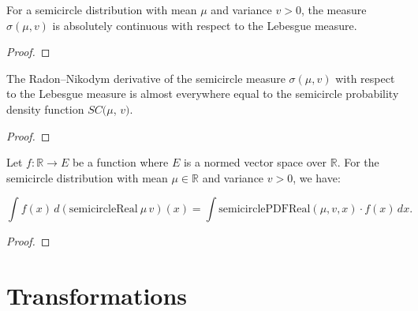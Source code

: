 \begin{lemma}
  \label{lem:semicircleReal_absolutelyContinuous}
  \leanok
  For a semicircle distribution with mean $\mu$ and variance $v > 0$, the measure $\sigma(\mu, v)$ is absolutely continuous with respect to the Lebesgue measure.
\end{lemma}

\begin{proof}
  \leanok
\end{proof}

\begin{lemma}
  \label{lem:rnDeriv_semicircleReal}
  \leanok
  The Radon–Nikodym derivative of the semicircle measure $\sigma(\mu, v)$ with respect to the Lebesgue measure is almost everywhere equal to the semicircle probability density function $SC(\mu$, $v)$.
\end{lemma}

\begin{proof}
  \leanok
\end{proof}

\begin{lemma}
  \label{lem:integral_semicircleReal_eq_integral_smul}
  \leanok

  Let $ f : \mathbb{R} \to E $ be a function where $ E $ is a normed vector space over $\mathbb{R}$. For the semicircle distribution with mean $\mu \in \mathbb{R}$ and variance $ v > 0 $, we have:

  \[
  \int f(x) \, d(\mathrm{semicircleReal}\ \mu\, v)(x) = \int \mathrm{semicirclePDFReal}(\mu, v, x) \cdot f(x) \, dx.
  \]


\end{lemma}

\begin{proof}
  \leanok
\end{proof}



\section{Transformations}

